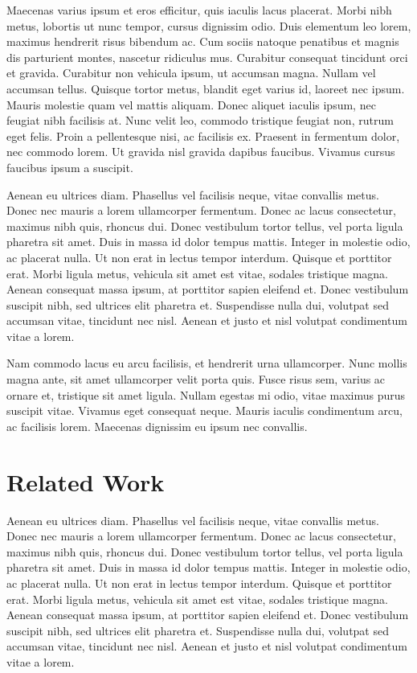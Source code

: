 \documentclass[conference]{IEEEtran}
\begin{document}
Maecenas varius ipsum et eros efficitur, quis iaculis lacus placerat. Morbi nibh metus, lobortis ut nunc tempor, cursus dignissim odio. Duis elementum leo lorem, maximus hendrerit risus bibendum ac. Cum sociis natoque penatibus et magnis dis parturient montes, nascetur ridiculus mus. Curabitur consequat tincidunt orci et gravida. Curabitur non vehicula ipsum, ut accumsan magna. Nullam vel accumsan tellus. Quisque tortor metus, blandit eget varius id, laoreet nec ipsum. Mauris molestie quam vel mattis aliquam. Donec aliquet iaculis ipsum, nec feugiat nibh facilisis at. Nunc velit leo, commodo tristique feugiat non, rutrum eget felis. Proin a pellentesque nisi, ac facilisis ex. Praesent in fermentum dolor, nec commodo lorem. Ut gravida nisl gravida dapibus faucibus. Vivamus cursus faucibus ipsum a suscipit.

Aenean eu ultrices diam. Phasellus vel facilisis neque, vitae convallis metus. Donec nec mauris a lorem ullamcorper fermentum. Donec ac lacus consectetur, maximus nibh quis, rhoncus dui. Donec vestibulum tortor tellus, vel porta ligula pharetra sit amet. Duis in massa id dolor tempus mattis. Integer in molestie odio, ac placerat nulla. Ut non erat in lectus tempor interdum. Quisque et porttitor erat. Morbi ligula metus, vehicula sit amet est vitae, sodales tristique magna. Aenean consequat massa ipsum, at porttitor sapien eleifend et. Donec vestibulum suscipit nibh, sed ultrices elit pharetra et. Suspendisse nulla dui, volutpat sed accumsan vitae, tincidunt nec nisl. Aenean et justo et nisl volutpat condimentum vitae a lorem.

Nam commodo lacus eu arcu facilisis, et hendrerit urna ullamcorper. Nunc mollis magna ante, sit amet ullamcorper velit porta quis. Fusce risus sem, varius ac ornare et, tristique sit amet ligula. Nullam egestas mi odio, vitae maximus purus suscipit vitae. Vivamus eget consequat neque. Mauris iaculis condimentum arcu, ac facilisis lorem. Maecenas dignissim eu ipsum nec convallis.

\section{Related Work}

Aenean eu ultrices diam. Phasellus vel facilisis neque, vitae convallis metus. Donec nec mauris a lorem ullamcorper fermentum. Donec ac lacus consectetur, maximus nibh quis, rhoncus dui. Donec vestibulum tortor tellus, vel porta ligula pharetra sit amet. Duis in massa id dolor tempus mattis. Integer in molestie odio, ac placerat nulla. Ut non erat in lectus tempor interdum. Quisque et porttitor erat. Morbi ligula metus, vehicula sit amet est vitae, sodales tristique magna. Aenean consequat massa ipsum, at porttitor sapien eleifend et. Donec vestibulum suscipit nibh, sed ultrices elit pharetra et. Suspendisse nulla dui, volutpat sed accumsan vitae, tincidunt nec nisl. Aenean et justo et nisl volutpat condimentum vitae a lorem.
\end{document}
